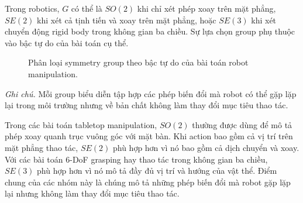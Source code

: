 Trong robotics, $G$ có thể là $SO(2)$ khi chỉ xét phép xoay trên mặt phẳng, $SE(2)$ khi xét cả tịnh tiến và xoay trên mặt phẳng, hoặc $SE(3)$ khi xét chuyển động rigid body trong không gian ba chiều. Sự lựa chọn group phụ thuộc vào bậc tự do của bài toán cụ thể.

\begin{figure}[H]
    \centering
    \caption{Phân loại symmetry group theo bậc tự do của bài toán robot manipulation.}
    \label{fig:group-taxonomy}
\end{figure}

\noindent\textit{Ghi chú.} Mỗi group biểu diễn tập hợp các phép biến đổi mà robot có thể gặp lặp lại trong môi trường nhưng về bản chất không làm thay đổi mục tiêu thao tác.

Trong các bài toán tabletop manipulation, $SO(2)$ thường được dùng để mô tả phép xoay quanh trục vuông góc với mặt bàn. Khi action bao gồm cả vị trí trên mặt phẳng thao tác, $SE(2)$ phù hợp hơn vì nó bao gồm cả dịch chuyển và xoay. Với các bài toán 6-DoF grasping hay thao tác trong không gian ba chiều, $SE(3)$ phù hợp hơn vì nó mô tả đầy đủ vị trí và hướng của vật thể. Điểm chung của các nhóm này là chúng mô tả những phép biến đổi mà robot gặp lặp lại nhưng không làm thay đổi mục tiêu thao tác.

